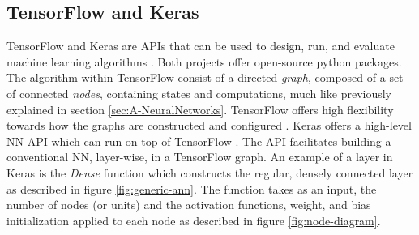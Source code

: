 \documentclass[../main.tex]{subfiles}
\begin{document}
\subsection{TensorFlow and Keras}
\label{sec:A-Tensorflow-and-Keras}
TensorFlow and Keras are \acp{API} that can be used to design, run, and evaluate machine learning algorithms \cite{tensorflow2015-whitepaper, chollet2015keras}.
Both projects offer open-source python packages.
The algorithm within TensorFlow consist of a directed \textit{graph}, composed of a set of connected \textit{nodes}, containing states and computations, much like previously explained in section \ref{sec:A-NeuralNetworks}.
TensorFlow offers high flexibility towards how the graphs are constructed and configured \cite{tensorflow2015-whitepaper}.
Keras offers a high-level \ac{NN} \ac{API} which can run on top of TensorFlow \cite{chollet2015keras}.
The API facilitates building a conventional \ac{NN}, layer-wise, in a TensorFlow graph.
An example of a layer in Keras is the \textit{Dense} function which constructs the regular, densely connected layer as described in figure \ref{fig:generic-ann}.
The function takes as an input, the number of nodes (or units) and the activation functions, weight, and bias initialization applied to each node as described in figure \ref{fig:node-diagram}.
\end{document}
